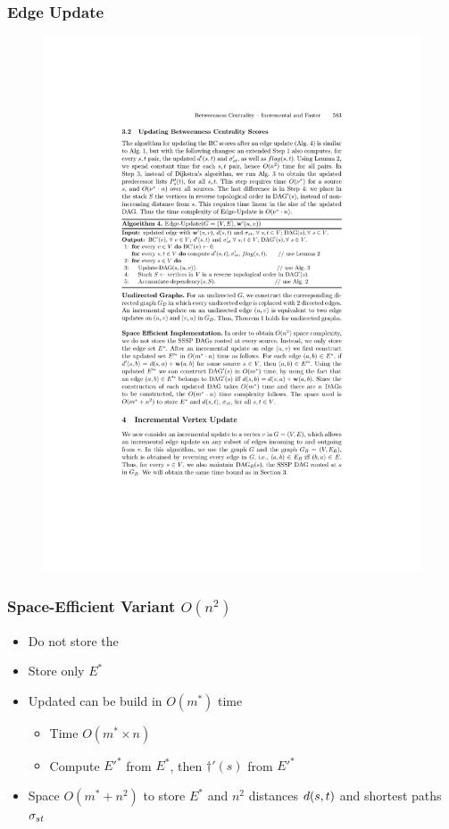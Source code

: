 \begin{frame}
  \frametitle{Edge Update}

  \begin{figure}[H]
    \centering
    \includegraphics[width=\textwidth]{imgs/npr14-algo4}
  \end{figure}
\end{frame}


\begin{frame}
  \frametitle{Space-Efficient Variant $O(n^2)$}
  
  \begin{itemize}
    \item Do not store the \sssp \dag
    \item Store only $E^*$
    \item Updated \dag can be build in $O(m^*)$ time
    \begin{itemize}
      \item Time $O(m^* \times n)$
      \item Compute ${E'}^*$ from $E^*$, then $\dag'(s)$ from ${E'}^*$
    \end{itemize}
    \item Space $O(m^* + n^2)$ to store $E^*$ and $n^2$ distances $d(s,t)$ and shortest paths $\sigma_{st}$
  \end{itemize}
\end{frame}


